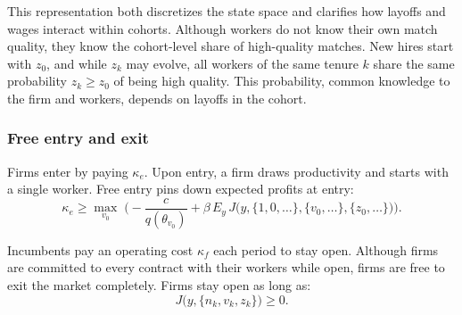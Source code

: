 This representation both discretizes the state space and clarifies how layoffs and wages interact within cohorts. Although workers do not know their own match quality, they know the cohort-level share of high-quality matches. New hires start with $z_0$, and while $z_k$ may evolve, all workers of the same tenure $k$ share the same probability $z_k\ge z_0$ of being high quality. This probability, common knowledge to the firm and workers, depends on layoffs in the cohort. %

\subsubsection*{Free entry and exit}
Firms enter by paying $\kappa_e$. Upon entry, a firm draws productivity and starts with a single worker. Free entry pins down expected profits at entry:
\begin{equation}\label{freeentry}
\kappa_e \ge \max_{v_0}\; \Big(-\frac{c}{q(\theta_{v_0})}+\beta\,E_y\,J\big(y,\{1,0,\ldots\},\{v_0,\ldots\},\{z_0,\ldots\}\big)\Big).
\end{equation}

Incumbents pay an operating cost $\kappa_f$ each period to stay open. Although firms are committed to every contract with their workers while open, firms are free to exit the market completely. Firms stay open as long as:
\begin{equation}\label{freeexit}
J\big(y,\{n_k,v_k,z_k\}\big)\ge 0.
\end{equation}

